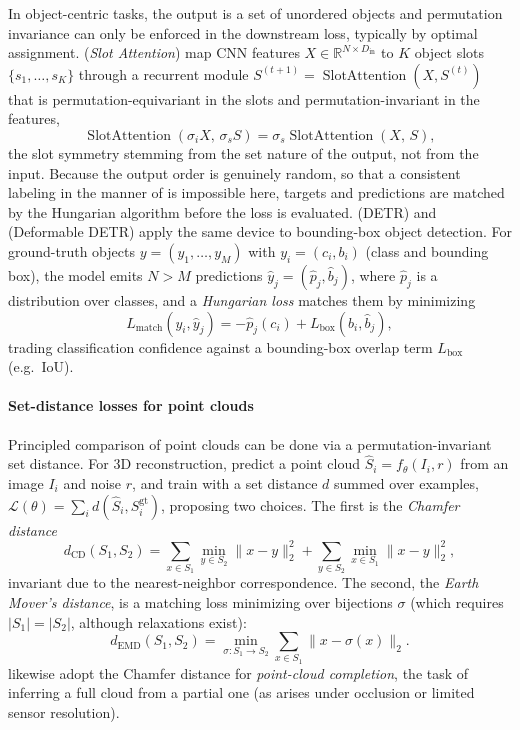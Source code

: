 \documentclass[mathematics,review,submit,moreauthors]{Definitions/mdpi}
\begin{document}
In object-centric tasks, the output is a set of unordered objects and permutation invariance can only be enforced in the downstream loss, typically by optimal assignment.
\citet{locatello2020anips} (\emph{Slot Attention}) map CNN features $X\in\mathbb{R}^{N\times D_{\mathrm{in}}}$ to $K$ object slots $\{s_1,\dots,s_K\}$ through a recurrent module $S^{(t+1)}=\operatorname{SlotAttention}(X,S^{(t)})$ that is permutation-equivariant in the slots and permutation-invariant in the features,
$$
\operatorname{SlotAttention}(\sigma_i X,\, \sigma_s S) = \sigma_s \operatorname{SlotAttention}(X,\, S),
$$
the slot symmetry stemming from the set nature of the output, not from the input.
Because the output order is genuinely random, so that a consistent labeling in the manner of \citet{caron2020anips} is impossible here, targets and predictions are matched by the Hungarian algorithm before the loss is evaluated.
\citet{carion2020cv-e2} (DETR) and \citet{zhu2021} (Deformable DETR) apply the same device to bounding-box object detection.
For ground-truth objects $y=(y_1,\dots,y_M)$ with $y_i=(c_i,b_i)$ (class and bounding box), the model emits $N>M$ predictions $\hat y_j=(\hat p_j,\hat b_j)$, where $\hat p_j$ is a distribution over classes, and a \emph{Hungarian loss} matches them by minimizing
$$
L_{\mathrm{match}}(y_i,\hat y_j) = -\hat p_j(c_i) + L_{\mathrm{box}}(b_i,\hat b_j),
$$
trading classification confidence against a bounding-box overlap term $L_{\mathrm{box}}$ (e.g.\ IoU).

\paragraph{Set-distance losses for point clouds}
Principled comparison of point clouds can be done via a permutation-invariant set distance.
For 3D reconstruction, \citet{fan2017} predict a point cloud $\hat S_i = f_\theta(I_i, r)$ from an image $I_i$ and noise $r$, and train with a set distance $d$ summed over examples, $\mathcal{L}(\theta)=\sum_i d(\hat S_i, S_i^{\mathrm{gt}})$, proposing two choices.
The first is the \emph{Chamfer distance}
$$
d_{\mathrm{CD}}(S_1,S_2) = \sum_{x\in S_1}\min_{y\in S_2}\|x-y\|_2^2 + \sum_{y\in S_2}\min_{x\in S_1}\|x-y\|_2^2,
$$
invariant due to the nearest-neighbor correspondence.
The second, the \emph{Earth Mover's distance}, is a matching loss minimizing over bijections $\sigma$ (which requires $|S_1|=|S_2|$, although relaxations exist):
$$
d_{\mathrm{EMD}}(S_1,S_2) = \min_{\sigma:S_1\to S_2}\sum_{x\in S_1}\|x-\sigma(x)\|_2 .
$$
\citet{lin2023} likewise adopt the Chamfer distance for \emph{point-cloud completion}, the task of inferring a full cloud from a partial one (as arises under occlusion or limited sensor resolution).
\end{document}
